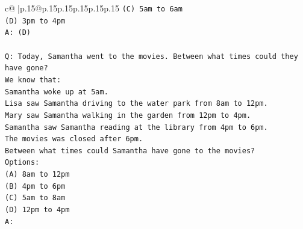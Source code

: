 \documentclass{article}
\begin{document}
{\begin{supertabular}{c@{$\;$}|p{.15\linewidth}@{}p{.15\linewidth}p{.15\linewidth}p{.15\linewidth}p{.15\linewidth}p{.15\linewidth}}
{{{\texttt{(C) 5am to 6am} \\
\texttt{(D) 3pm to 4pm} \\
\texttt{A: (D)} \\
\\ 
\texttt{Q: Today, Samantha went to the movies. Between what times could they have gone?} \\
\texttt{We know that:} \\
\texttt{Samantha woke up at 5am.} \\
\texttt{Lisa saw Samantha driving to the water park from 8am to 12pm.} \\
\texttt{Mary saw Samantha walking in the garden from 12pm to 4pm.} \\
\texttt{Samantha saw Samantha reading at the library from 4pm to 6pm.} \\
\texttt{The movies was closed after 6pm.} \\
\texttt{Between what times could Samantha have gone to the movies?} \\
\texttt{Options:} \\
\texttt{(A) 8am to 12pm} \\
\texttt{(B) 4pm to 6pm} \\
\texttt{(C) 5am to 8am} \\
\texttt{(D) 12pm to 4pm} \\
\texttt{A:} \\
            }
        }
    }
     \\ \\


\end{supertabular}}
\end{document}
